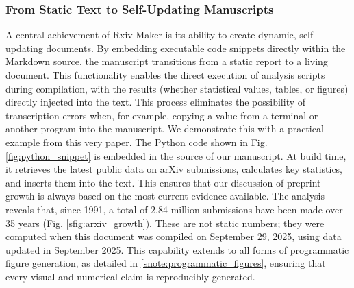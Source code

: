 \documentclass[times, twoside]{rxiv_maker_style}
\begin{document}
\subsubsection{From Static Text to Self-Updating Manuscripts}
A central achievement of Rxiv-Maker is its ability to create dynamic, self-updating documents. By embedding executable code snippets directly within the Markdown source, the manuscript transitions from a static report to a living document. This functionality enables the direct execution of analysis scripts during compilation, with the results (whether statistical values, tables, or figures) directly injected into the text. This process eliminates the possibility of transcription errors when, for example, copying a value from a terminal or another program into the manuscript.
We demonstrate this with a practical example from this very paper. The Python code shown in Fig. \ref{fig:python_snippet} is embedded in the source of our manuscript. At build time, it retrieves the latest public data on arXiv submissions, calculates key statistics, and inserts them into the text. This ensures that our discussion of preprint growth is always based on the most current evidence available. The analysis reveals that, since 1991, a total of 2.84 million submissions have been made over 35 years (Fig. \ref{sfig:arxiv_growth}). These are not static numbers; they were computed when this document was compiled on September 29, 2025, using data updated in September 2025. This capability extends to all forms of programmatic figure generation, as detailed in \ref{snote:programmatic_figures}, ensuring that every visual and numerical claim is reproducibly generated.
\end{document}
